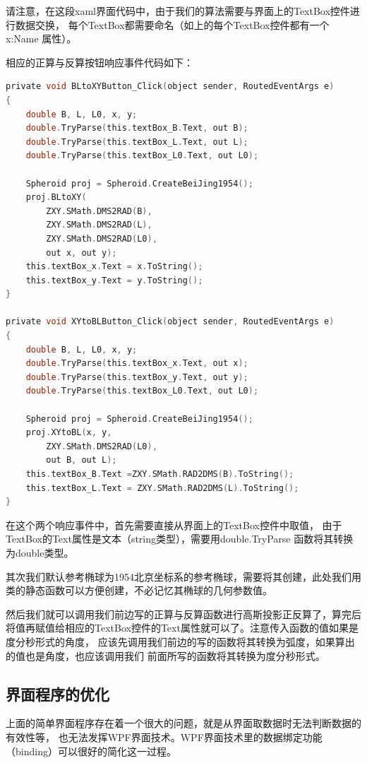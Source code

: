 请注意，在这段xaml界面代码中，由于我们的算法需要与界面上的TextBox控件进行数据交换，
每个TextBox都需要命名（如上的每个TextBox控件都有一个 x:Name 属性）。

相应的正算与反算按钮响应事件代码如下：

\begin{lstlisting}[language=C]
private void BLtoXYButton_Click(object sender, RoutedEventArgs e)
{
    double B, L, L0, x, y;
    double.TryParse(this.textBox_B.Text, out B);
    double.TryParse(this.textBox_L.Text, out L);
    double.TryParse(this.textBox_L0.Text, out L0);

    Spheroid proj = Spheroid.CreateBeiJing1954();
    proj.BLtoXY(
        ZXY.SMath.DMS2RAD(B),
        ZXY.SMath.DMS2RAD(L),
        ZXY.SMath.DMS2RAD(L0),
        out x, out y);
    this.textBox_x.Text = x.ToString();
    this.textBox_y.Text = y.ToString();
}

private void XYtoBLButton_Click(object sender, RoutedEventArgs e)
{
    double B, L, L0, x, y;
    double.TryParse(this.textBox_x.Text, out x);
    double.TryParse(this.textBox_y.Text, out y);
    double.TryParse(this.textBox_L0.Text, out L0);

    Spheroid proj = Spheroid.CreateBeiJing1954();
    proj.XYtoBL(x, y,
        ZXY.SMath.DMS2RAD(L0),
        out B, out L);
    this.textBox_B.Text =ZXY.SMath.RAD2DMS(B).ToString();
    this.textBox_L.Text = ZXY.SMath.RAD2DMS(L).ToString();
}
\end{lstlisting}

在这个两个响应事件中，首先需要直接从界面上的TextBox控件中取值，
由于TextBox的Text属性是文本（string类型），需要用double.TryParse
函数将其转换为double类型。

其次我们默认参考椭球为1954北京坐标系的参考椭球，需要将其创建，此处我们用
类的静态函数可以方便创建，不必记忆其椭球的几何参数值。

然后我们就可以调用我们前边写的正算与反算函数进行高斯投影正反算了，算完后
将值再赋值给相应的TextBox控件的Text属性就可以了。注意传入函数的值如果是度分秒形式的角度，
应该先调用我们前边的写的函数将其转换为弧度，如果算出的值也是角度，也应该调用我们
前面所写的函数将其转换为度分秒形式。


\subsection{界面程序的优化}
上面的简单界面程序存在着一个很大的问题，就是从界面取数据时无法判断数据的有效性等，
也无法发挥WPF界面技术。WPF界面技术里的数据绑定功能（binding）可以很好的简化这一过程。

